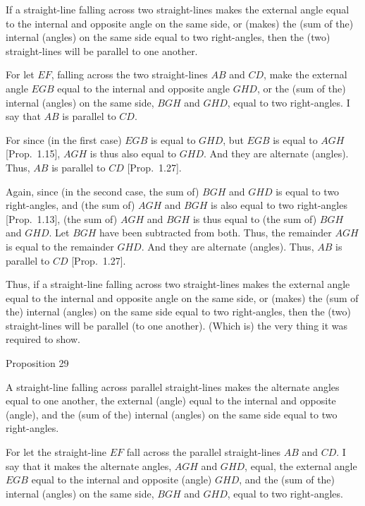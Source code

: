 If a straight-line falling across two straight-lines makes the external angle equal
to the internal and opposite angle on the same side, or (makes) the (sum  of the) internal
(angles) on the same side equal
to two right-angles, then the (two) straight-lines will be parallel to
one another.

\epsfysize=2.2in
\centerline{}

For let $EF$, falling across the two straight-lines $AB$ and $CD$, make the external
angle $EGB$ equal to the internal and opposite angle $GHD$, or the (sum of the) internal
(angles) on the same side, $BGH$ and $GHD$, equal to two right-angles.
I say that $AB$ is parallel to $CD$.

For since (in the first case) $EGB$ is equal to $GHD$, but $EGB$ is equal to $AGH$ [Prop.~1.15],
$AGH$ is thus also equal to $GHD$. And they are alternate (angles).
Thus, $AB$ is
 parallel to $CD$ [Prop.~1.27].
 
Again, since (in the second case, the sum of) $BGH$ and $GHD$ is equal to two right-angles,  and (the sum of) $AGH$ and
$BGH$ is also equal to two right-angles [Prop.~1.13], 
(the sum of) $AGH$ and $BGH$ is thus equal to (the sum of) $BGH$ and $GHD$. Let $BGH$ have been
subtracted from both. Thus, the remainder $AGH$ is equal to the remainder
$GHD$. And they are alternate (angles). Thus, $AB$ is parallel
to $CD$ [Prop.~1.27].

Thus, if a straight-line falling across  two straight-lines makes the external angle equal
to the internal and opposite angle on the same side, or (makes) the (sum of the) internal
(angles) on the same side equal
to two right-angles, then the (two) straight-lines will be parallel (to
one another). (Which is) the very thing it was required to show.


\begin{center}
{\large Proposition 29}
\end{center}

A straight-line falling across  parallel straight-lines makes the alternate angles
equal to one another,  the external (angle) equal to the internal and
opposite (angle), and the (sum of the) internal (angles) on the same side equal to
two right-angles.

\epsfysize=2.2in
\centerline{}

For let the straight-line $EF$ fall across the parallel straight-lines $AB$ and $CD$.
I say that it makes the  alternate angles, $AGH$ and $GHD$,  equal,  the
external angle $EGB$ equal to the internal and opposite (angle) $GHD$,
and the (sum of the) internal (angles) on the same side, $BGH$ and $GHD$, equal to
two right-angles.

